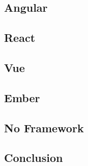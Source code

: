 \documentclass[draftclsnofoot,onecolumn,letterpaper,10pt,compsoc]{IEEEtran}
\begin{document}
	\subsection{Angular}
	\subsection{React}
  \subsection{Vue}
	\subsection{Ember}
  \subsection{No Framework}
  \subsection{Conclusion}


{}

\end{document}
